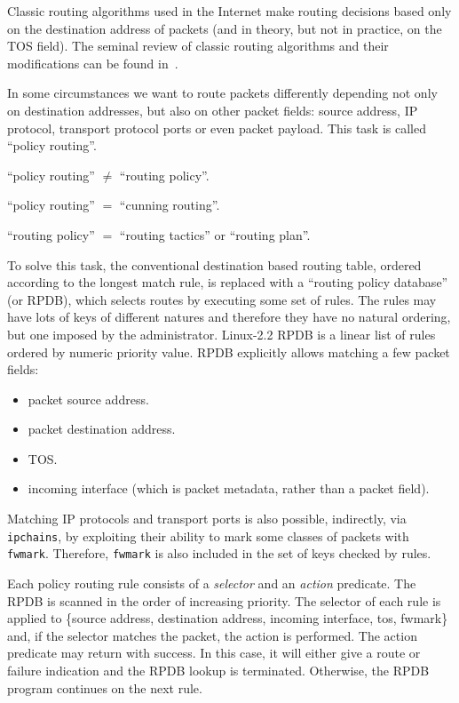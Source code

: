 Classic routing algorithms used in the Internet make routing decisions
based only on the destination address of packets (and in theory,
but not in practice, on the TOS field). The seminal review of classic
routing algorithms and their modifications can be found in~\cite{RFC1812}.

In some circumstances we want to route packets differently depending not only
on destination addresses, but also on other packet fields: source address,
IP protocol, transport protocol ports or even packet payload.
This task is called ``policy routing''.

\begin{NB}
  ``policy routing'' $\neq$ ``routing policy''.

\noindent	``policy routing'' $=$ ``cunning routing''.

\noindent	``routing policy'' $=$ ``routing tactics'' or ``routing plan''.
\end{NB}

To solve this task, the conventional destination based routing table, ordered
according to the longest match rule, is replaced with a ``routing policy
database'' (or RPDB), which selects routes
by executing some set of rules. The rules may have lots of keys of different
natures and therefore they have no natural ordering, but one imposed
by the administrator. Linux-2.2 RPDB is a linear list of rules
ordered by numeric priority value.
RPDB explicitly allows matching a few packet fields:

\begin{itemize}
\item packet source address.
\item packet destination address.
\item TOS.
\item incoming interface (which is packet metadata, rather than a packet field).
\end{itemize}

Matching IP protocols and transport ports is also possible,
indirectly, via \verb|ipchains|, by exploiting their ability
to mark some classes of packets with \verb|fwmark|. Therefore,
\verb|fwmark| is also included in the set of keys checked by rules.

Each policy routing rule consists of a {\em selector\/} and an {\em action\/}
predicate. The RPDB is scanned in the order of increasing priority. The selector
of each rule is applied to \{source address, destination address, incoming
interface, tos, fwmark\} and, if the selector matches the packet,
the action is performed.  The action predicate may return with success.
In this case, it will either give a route or failure indication
and the RPDB lookup is terminated. Otherwise, the RPDB program
continues on the next rule.

